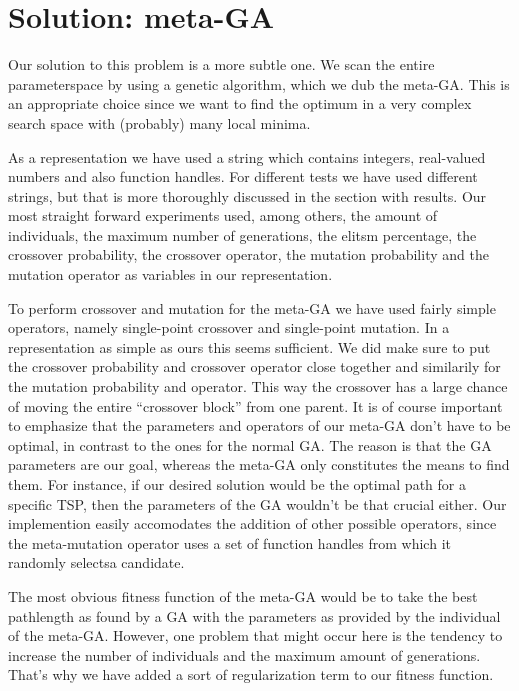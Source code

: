 \documentclass[a4paper]{article}
\begin{document}
\section{Solution: meta-GA}
Our solution to this problem is a more subtle one. We scan the entire parameterspace by using a genetic algorithm, which we dub the meta-GA. This is an appropriate choice since we want to find the optimum in a very complex search space with (probably) many local minima.
\par
As a representation we have used a string which contains integers, real-valued numbers and also function handles. For different tests we have used different strings, but that is more thoroughly discussed in the section with results. Our most straight forward experiments used, among others, the amount of individuals, the maximum number of generations, the elitsm percentage, the crossover probability, the crossover operator, the mutation probability and the mutation operator as variables in our representation.
\par
To perform crossover and mutation for the meta-GA we have used fairly simple operators, namely single-point crossover and single-point mutation. In a representation as simple as ours this seems sufficient. We did make sure to put the crossover probability and crossover operator close together and similarily for the mutation probability and operator. This way the crossover has a large chance of moving the entire ``crossover block'' from one parent. It is of course important to emphasize that the parameters and operators of our meta-GA don't have to be optimal, in contrast to the ones for the normal GA. The reason is that the GA parameters are our goal, whereas the meta-GA only constitutes the means to find them. For instance, if our desired solution would be the optimal path for a specific TSP, then the parameters of the GA wouldn't be that crucial either. Our implemention easily accomodates the addition of other possible operators, since the meta-mutation operator uses a set of function handles from which it randomly selectsa candidate.
\par
The most obvious fitness function of the meta-GA would be to take the best pathlength as found by a GA with the parameters as provided by the individual of the meta-GA. However, one problem that might occur here is the tendency to increase the number of individuals and the maximum amount of generations. That's why we have added a sort of regularization term to our fitness function.
\end{document}
